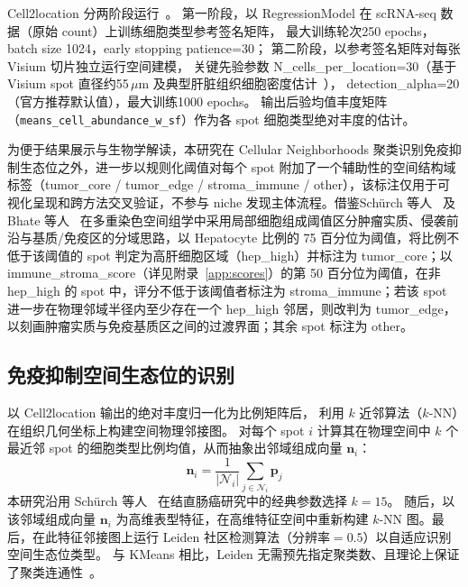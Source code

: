 \documentclass[12pt, a4paper]{ctexart}
\begin{document}
Cell2location 分两阶段运行~\citep{kleshchevnikov2022cell2location}。
第一阶段，以 RegressionModel 在 scRNA-seq 数据（原始 count）上训练细胞类型参考签名矩阵，
最大训练轮次250 epochs，batch size 1024，early stopping patience=30；
第二阶段，以参考签名矩阵对每张 Visium 切片独立运行空间建模，
关键先验参数 N\_cells\_per\_location=30（基于 Visium spot 直径约55\,$\mu$m 及典型肝脏组织细胞密度估计~\citep{kleshchevnikov2022cell2location}），
detection\_alpha=20（官方推荐默认值），最大训练1000 epochs。
输出后验均值丰度矩阵（\texttt{means\_cell\_abundance\_w\_sf}）作为各 spot 细胞类型绝对丰度的估计。

为便于结果展示与生物学解读，本研究在 Cellular Neighborhoods 聚类识别免疫抑制生态位之外，进一步以规则化阈值对每个 spot 附加了一个辅助性的空间结构域标签（tumor\_core / tumor\_edge / stroma\_immune / other），该标注仅用于可视化呈现和跨方法交叉验证，不参与 niche 发现主体流程。借鉴Schürch 等人~\citep{schurch2020coordinated} 及 Bhate 等人~\citep{bhate2022tissue} 在多重染色空间组学中采用局部细胞组成阈值区分肿瘤实质、侵袭前沿与基质/免疫区的分域思路，以 Hepatocyte 比例的 75 百分位为阈值，将比例不低于该阈值的 spot 判定为高肝细胞区域（hep\_high）并标注为 tumor\_core；以 immune\_stroma\_score（详见附录~\ref{app:scores}）的第 50 百分位为阈值，在非 hep\_high 的 spot 中，评分不低于该阈值者标注为 stroma\_immune；若该 spot 进一步在物理邻域半径内至少存在一个 hep\_high 邻居，则改判为 tumor\_edge，以刻画肿瘤实质与免疫基质区之间的过渡界面；其余 spot 标注为 other。

\subsection{免疫抑制空间生态位的识别}

以 Cell2location 输出的绝对丰度归一化为比例矩阵后，
利用 $k$ 近邻算法（$k$-NN）在组织几何坐标上构建空间物理邻接图。
对每个 spot $i$ 计算其在物理空间中 $k$ 个最近邻 spot 的细胞类型比例均值，从而抽象出邻域组成向量 $\mathbf{n}_i$：
\begin{equation}
\mathbf{n}_i = \frac{1}{|\mathcal{N}_i|} \sum_{j \in \mathcal{N}_i} \mathbf{p}_j
\label{eq:neighborhood_vector}
\end{equation}
本研究沿用 Schürch 等人~\citep{schurch2020coordinated} 在结直肠癌研究中的经典参数选择 $k=15$。
随后，以该邻域组成向量 $\mathbf{n}_i$ 为高维表型特征，在高维特征空间中重新构建 $k$-NN 图。最后，在此特征邻接图上运行 Leiden 社区检测算法（分辨率$=0.5$）以自适应识别空间生态位类型。
与 KMeans 相比，Leiden 无需预先指定聚类数、且理论上保证了聚类连通性~\citep{traag2019leiden}。
\end{document}
